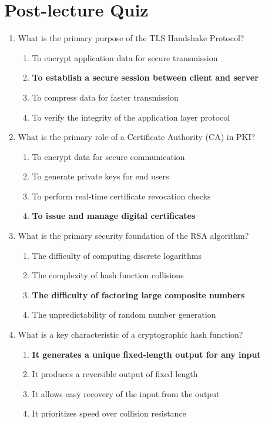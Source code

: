 \newpage

\section{Post-lecture Quiz}

\begin{enumerate}
    \item What is the primary purpose of the TLS Handshake Protocol?
    \begin{enumerate}
        \item To encrypt application data for secure transmission
        \item \textbf{To establish a secure session between client and server}
        \item To compress data for faster transmission
        \item To verify the integrity of the application layer protocol
    \end{enumerate}

    \item What is the primary role of a Certificate Authority (CA) in PKI?
    \begin{enumerate}
        \item To encrypt data for secure communication
        \item To generate private keys for end users
        \item To perform real-time certificate revocation checks
        \item \textbf{To issue and manage digital certificates}
    \end{enumerate}

    \item What is the primary security foundation of the RSA algorithm?
    \begin{enumerate}
        \item The difficulty of computing discrete logarithms
        \item The complexity of hash function collisions
        \item \textbf{The difficulty of factoring large composite numbers}
        \item The unpredictability of random number generation
    \end{enumerate}

    \item What is a key characteristic of a cryptographic hash function?
    \begin{enumerate}
        \item \textbf{It generates a unique fixed-length output for any input}
        \item It produces a reversible output of fixed length
        \item It allows easy recovery of the input from the output
        \item It prioritizes speed over collision resistance
    \end{enumerate}


\end{enumerate}
